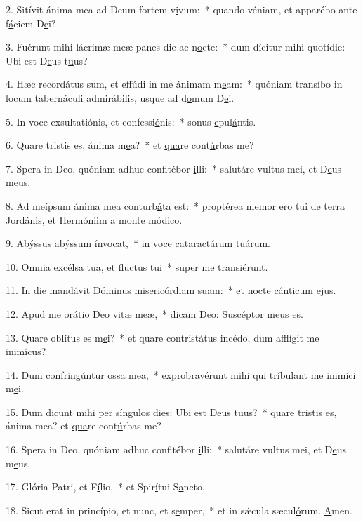 2. Sitívit ánima mea ad Deum fortem v\uline{i}vum:~* quando véniam, et apparébo ante f\uline{á}ciem D\uline{e}i?\par 
3. Fuérunt mihi lácrimæ meæ panes die ac n\uline{o}cte:~* dum dícitur mihi quotídie: Ubi est D\uline{e}us t\uline{u}us?\par 
4. Hæc recordátus sum, et effúdi in me ánimam m\uline{e}am:~* quóniam transíbo in locum tabernáculi admirábilis, usque ad d\uline{o}mum D\uline{e}i.\par 
5. In voce exsultatiónis, et confessi\uline{ó}nis:~* sonus \uline{e}pul\uline{á}ntis.\par 
6. Quare tristis es, ánima m\uline{e}a?~* et \uline{qua}re cont\uline{ú}rbas me?\par 
7. Spera in Deo, quóniam adhuc confitébor \uline{i}lli:~* salutáre vultus mei, et D\uline{e}us m\uline{e}us.\par 
8. Ad meípsum ánima mea conturb\uline{á}ta est:~* proptérea memor ero tui de terra Jordánis, et Hermóniim a m\uline{o}nte m\uline{ó}dico.\par 
9. Abýssus abýssum \uline{í}nvocat,~* in voce cataract\uline{á}rum tu\uline{á}rum.\par 
10. Omnia excélsa tua, et fluctus t\uline{u}i~* super me tr\uline{a}nsi\uline{é}runt.\par 
11. In die mandávit Dóminus misericórdiam s\uline{u}am:~* et nocte c\uline{á}nticum \uline{e}jus.\par 
12. Apud me orátio Deo vitæ m\uline{e}æ,~* dicam Deo: Susc\uline{é}ptor m\uline{e}us es.\par 
13. Quare oblítus es m\uline{e}i?~* et quare contristátus incédo, dum afflígit me \uline{i}nim\uline{í}cus?\par 
14. Dum confringúntur ossa m\uline{e}a,~* exprobravérunt mihi qui tríbulant me inim\uline{í}ci m\uline{e}i.\par 
15. Dum dicunt mihi per síngulos dies: Ubi est Deus t\uline{u}us?~* quare tristis es, ánima mea? et \uline{qua}re cont\uline{ú}rbas me?\par 
16. Spera in Deo, quóniam adhuc confitébor \uline{i}lli:~* salutáre vultus mei, et D\uline{e}us m\uline{e}us.\par 
17. Glória Patri, et F\uline{í}lio,~* et Spir\uline{í}tui S\uline{a}ncto.\par 
18. Sicut erat in princípio, et nunc, et s\uline{e}mper,~* et in sǽcula sæcul\uline{ó}rum. \uline{A}men.\par 
